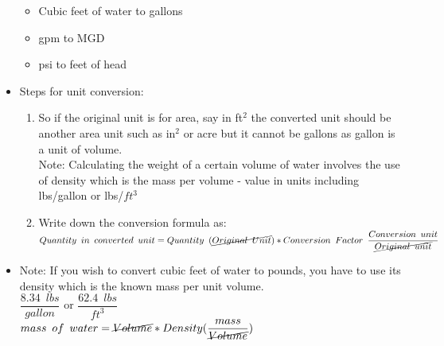 \begin{itemize}
\begin{itemize}
  \item Cubic feet of water to gallons


  \item gpm to MGD 

  \item psi to feet of head

\end{itemize}

\item Steps for unit conversion:\\
\begin{enumerate}[Step 1:]
\item {}  So if the original unit is for area, say in ft$^2$ the converted unit should be another area unit such as in$^2$ or acre but it cannot be gallons as gallon is a unit of volume.\\
Note:  Calculating the weight of a certain volume of water involves the use of density which is the mass per volume -  value in units including lbs/gallon or lbs/$ft^3$\\

\item Write down the conversion formula as:\\

$Quantity \enspace in \enspace converted \enspace unit = Quantity \enspace (\cancel{Original \enspace Unit}) *   Conversion  \enspace Factor \enspace  \dfrac{Conversion \enspace unit}{\cancel{Original \enspace unit}}$\\
\end{enumerate}

\item Note:  If you wish to convert cubic feet of water to pounds, you have to use its density which is the known mass per unit volume.\\
$\dfrac{8.34 \enspace lbs}{gallon}$ or $\dfrac{62.4 \enspace lbs}{ft^3}$\\
$mass \enspace of \enspace water = \cancel{Volume} *   Density  (\dfrac{mass}{\cancel{Volume}})$\\

\end{itemize}

